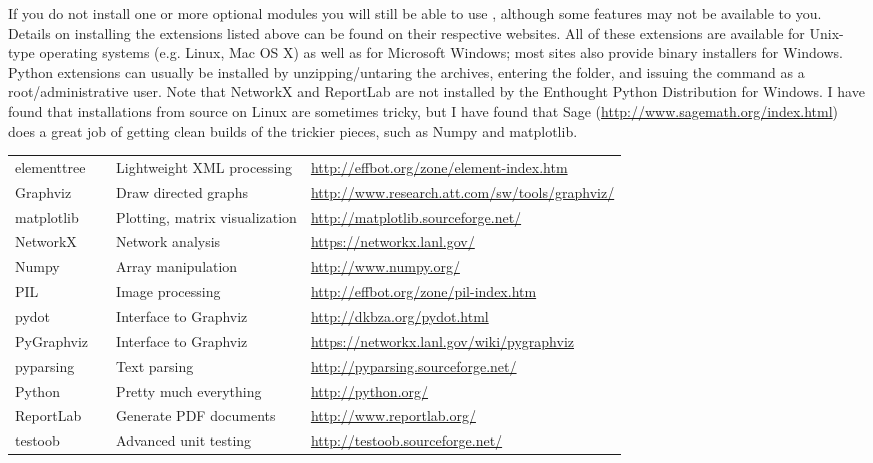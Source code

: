 If you do not install one or more optional modules you will still be able to use \PyPedal{}, although some features may not be available to you. Details on installing the extensions listed above can be found on their respective websites.  All of these extensions are available for Unix-type operating systems (e.g. Linux, Mac OS X) as well as for Microsoft Windows; most sites also provide binary installers for Windows. Python extensions can usually be installed by unzipping/untaring the archives, entering the folder, and issuing the command  as a root/administrative user. Note that NetworkX and ReportLab are not installed by the Enthought Python Distribution for Windows. I have found that installations from source on Linux are sometimes tricky, but I have found that Sage (\url{http://www.sagemath.org/index.html}) does a great job of getting clean builds of the trickier pieces, such as Numpy and matplotlib.
\begin{center}
    \tablelasttail{\hline}
    \label{tbl:extensions}
    \begin{xtabular}{lllp{4in}}
	elementtree &  & Lightweight XML processing & \url{http://effbot.org/zone/element-index.htm}\\
	Graphviz &  & Draw directed graphs & \url{http://www.research.att.com/sw/tools/graphviz/}\\
	matplotlib &  & Plotting, matrix visualization & \url{http://matplotlib.sourceforge.net/}\\
	NetworkX &  & Network analysis & \url{https://networkx.lanl.gov/}\\
	Numpy &  & Array manipulation & \url{http://www.numpy.org/}\\
	PIL &  & Image processing & \url{http://effbot.org/zone/pil-index.htm}\\
	pydot &  & Interface to Graphviz & \url{http://dkbza.org/pydot.html}\\
	PyGraphviz &  & Interface to Graphviz & \url{https://networkx.lanl.gov/wiki/pygraphviz}\\
	pyparsing &  & Text parsing & \url{http://pyparsing.sourceforge.net/}\\
	Python &  & Pretty much everything & \url{http://python.org/}\\
	ReportLab &  & Generate PDF documents & \url{http://www.reportlab.org/}\\
	testoob &  & Advanced unit testing & \url{http://testoob.sourceforge.net/}\\
    \end{xtabular}
\end{center}
